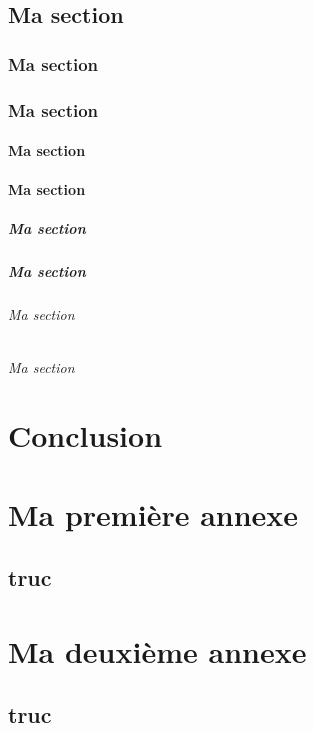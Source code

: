 \documentclass[bare]{polytech/polytech}
\begin{document}
\section{Ma section}
\lipsum[1-5]

          
\subsection{Ma section}
\lipsum[1-5]
\subsection{Ma section}
\lipsum[1-5]
\subsubsection{Ma section}
\lipsum[1-5]
\subsubsection{Ma section}
\lipsum[1-5]
\paragraph{Ma section}
\lipsum[1-5]
\paragraph{Ma section}
\lipsum[1-5]
\subparagraph{Ma section}
\lipsum[1-5]
\subparagraph{Ma section}
\lipsum[1-5]
  
\chapter*{Conclusion}

\lipsum[1-2]

\appendix   

\chapter{Ma première annexe}

\lipsum[1-4]

\section{truc}

\lipsum[1-4]
 
\chapter{Ma deuxième annexe}
  

\section{truc}

\lipsum[1-4]
\end{document}

